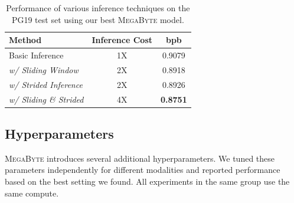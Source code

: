 \documentclass{article}
\newcommand{\fastslow}[0]{\textsc{MegaByte}\xspace}
\newcommand{\megabyte}[0]{\fastslow}
\theoremstyle{plain}
\theoremstyle{definition}
\theoremstyle{remark}
\begin{document}





\begin{table}[t]
    \centering\small
    \begin{tabular}{lcc}
    \toprule
    Method & Inference Cost & bpb \\
    \midrule
    Basic Inference & 1X & 0.9079 \\
    \hspace{2pt} \textit{w/ Sliding Window} & 2X & 0.8918 \\
    \hspace{2pt} \textit{w/ Strided Inference} & 2X & 0.8926 \\
    \hspace{2pt} \textit{w/ Sliding \& Strided} & 4X & \textbf{0.8751} \\
    \bottomrule
    \end{tabular}
    \caption{Performance of various inference techniques on the PG19 test set using our best \fastslow model.}
    \label{tab:inference_options}
\end{table}

\subsection{Hyperparameters}

\megabyte introduces several additional hyperparameters. We tuned these parameters independently for different modalities and reported performance based on the best setting we found. All experiments in the same group use the same compute. 
\end{document}
